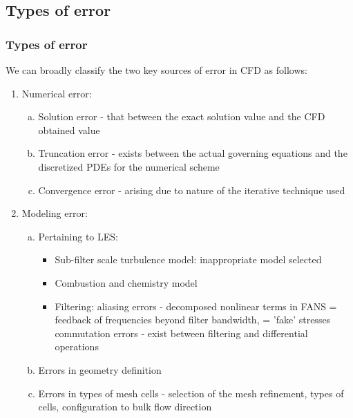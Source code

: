 \documentclass{beamer}
\begin{document}
\subsection{Types of error}
\begin{frame}%
\frametitle{Types of error}
\scriptsize
We can broadly classify the two key sources of error in CFD as follows:

\begin{enumerate}[1.]
\item Numerical error:
	\begin{enumerate}[(a)]
	\scriptsize
	\item Solution error - that between the exact solution value and the CFD obtained value
	\item Truncation error - exists between the actual governing equations and the discretized PDEs for the numerical scheme
	\item Convergence error - arising due to nature of the iterative technique used
	\end{enumerate}
\item Modeling error:
	\begin{enumerate}[(a)]
	\scriptsize
	\item Pertaining to LES:
		\begin{itemize}
		\tiny
		\item Sub-filter scale turbulence model: inappropriate model selected
		\item Combustion and chemistry model
		\item Filtering:\newline
			  aliasing errors - decomposed nonlinear terms in FANS = feedback of frequencies beyond filter bandwidth, = 'fake' stresses \newline
			 commutation errors - exist between filtering and differential operations 
		\end{itemize}
	\item Errors in geometry definition 
	\item Errors in types of mesh cells - selection of the mesh refinement, types of cells, configuration to bulk flow direction
	\end{enumerate}
\end{enumerate}

\end{frame}





\end{document}
